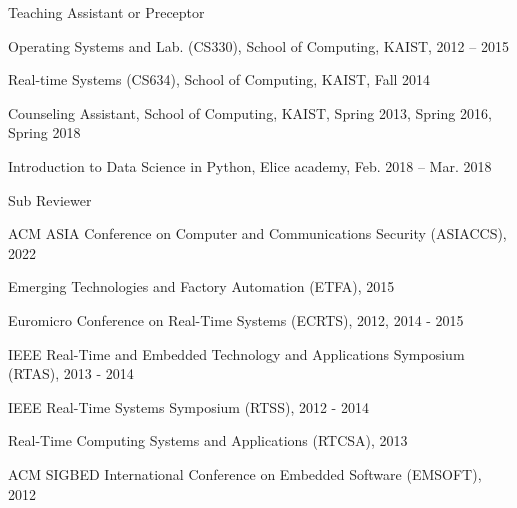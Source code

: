 \documentclass[11pt,letterpaper]{article}
\begin{document}
\begin{envtime}[]{Teaching Assistant or Preceptor}{}
	\item{Operating Systems and Lab. (CS330), School of Computing, KAIST}{, 2012 -- 2015}
	\item{Real-time Systems (CS634), School of Computing, KAIST}{, Fall 2014}
	\item{Counseling Assistant, School of Computing, KAIST}{, Spring 2013, Spring 2016, Spring 2018}
	\item{Introduction to Data Science in Python, Elice academy}{, Feb. 2018 -- Mar. 2018}
\end{envtime}


\begin{envtime}[]{Sub Reviewer}{}
	\item{ACM ASIA Conference on Computer and Communications Security (ASIACCS)}{, 2022}
	\item{Emerging Technologies and Factory Automation (ETFA)}{, 2015}
	\item{Euromicro Conference on Real-Time Systems (ECRTS)}{, 2012, 2014 - 2015}
	\item{IEEE Real-Time and Embedded Technology and Applications Symposium (RTAS)}{, 2013 - 2014}
	\item{IEEE Real-Time Systems Symposium (RTSS)}{, 2012 - 2014}
	\item{Real-Time Computing Systems and Applications (RTCSA)}{, 2013}
	\item{ACM SIGBED International Conference on Embedded Software (EMSOFT)}{, 2012}





						
\end{envtime}
\end{document}
